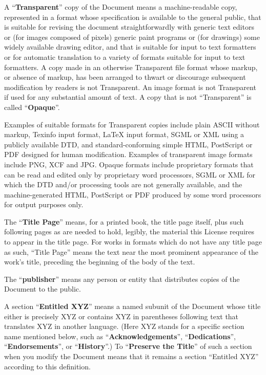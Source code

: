 \begin{enumerate}
A ``\textbf{Transparent}'' copy of the Document means a machine-readable copy,
represented in a format whose specification is available to the
general public, that is suitable for revising the document
straightforwardly with generic text editors or (for images composed of
pixels) generic paint programs or (for drawings) some widely available
drawing editor, and that is suitable for input to text formatters or
for automatic translation to a variety of formats suitable for input
to text formatters.  A copy made in an otherwise Transparent file
format whose markup, or absence of markup, has been arranged to thwart
or discourage subsequent modification by readers is not Transparent.
An image format is not Transparent if used for any substantial amount
of text.  A copy that is not ``Transparent'' is called ``\textbf{Opaque}''.

Examples of suitable formats for Transparent copies include plain
ASCII without markup, Texinfo input format, LaTeX input format, SGML
or XML using a publicly available DTD, and standard-conforming simple
HTML, PostScript or PDF designed for human modification.  Examples of
transparent image formats include PNG, XCF and JPG.  Opaque formats
include proprietary formats that can be read and edited only by
proprietary word processors, SGML or XML for which the DTD and/or
processing tools are not generally available, and the
machine-generated HTML, PostScript or PDF produced by some word
processors for output purposes only.

The ``\textbf{Title Page}'' means, for a printed book, the title page itself,
plus such following pages as are needed to hold, legibly, the material
this License requires to appear in the title page.  For works in
formats which do not have any title page as such, ``Title Page'' means
the text near the most prominent appearance of the work's title,
preceding the beginning of the body of the text.

The ``\textbf{publisher}'' means any person or entity that distributes
copies of the Document to the public.

A section ``\textbf{Entitled XYZ}'' means a named subunit of the Document whose
title either is precisely XYZ or contains XYZ in parentheses following
text that translates XYZ in another language.  (Here XYZ stands for a
specific section name mentioned below, such as ``\textbf{Acknowledgements}'',
``\textbf{Dedications}'', ``\textbf{Endorsements}'', or ``\textbf{History}''.)  
To ``\textbf{Preserve the Title}''
of such a section when you modify the Document means that it remains a
section ``Entitled XYZ'' according to this definition.


\end{enumerate}
